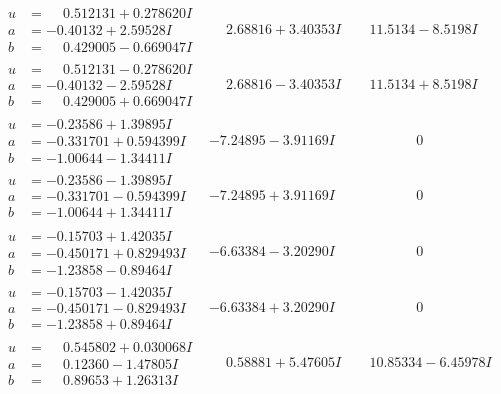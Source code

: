 \documentclass[1p]{elsarticle_modified}
\theoremstyle{definition}
\begin{document}
$$\begin{array}{c|c|c}
\begin{aligned}
u &= \phantom{-}0.512131 + 0.278620 I \\
a &= -0.40132 + 2.59528 I \\
b &= \phantom{-}0.429005 - 0.669047 I\end{aligned}
 & \phantom{-}2.68816 + 3.40353 I & \phantom{-}11.5134 - 8.5198 I \\ \hline\begin{aligned}
u &= \phantom{-}0.512131 - 0.278620 I \\
a &= -0.40132 - 2.59528 I \\
b &= \phantom{-}0.429005 + 0.669047 I\end{aligned}
 & \phantom{-}2.68816 - 3.40353 I & \phantom{-}11.5134 + 8.5198 I \\ \hline\begin{aligned}
u &= -0.23586 + 1.39895 I \\
a &= -0.331701 + 0.594399 I \\
b &= -1.00644 - 1.34411 I\end{aligned}
 & -7.24895 - 3.91169 I & \phantom{-0.000000 } 0 \\ \hline\begin{aligned}
u &= -0.23586 - 1.39895 I \\
a &= -0.331701 - 0.594399 I \\
b &= -1.00644 + 1.34411 I\end{aligned}
 & -7.24895 + 3.91169 I & \phantom{-0.000000 } 0 \\ \hline\begin{aligned}
u &= -0.15703 + 1.42035 I \\
a &= -0.450171 + 0.829493 I \\
b &= -1.23858 - 0.89464 I\end{aligned}
 & -6.63384 - 3.20290 I & \phantom{-0.000000 } 0 \\ \hline\begin{aligned}
u &= -0.15703 - 1.42035 I \\
a &= -0.450171 - 0.829493 I \\
b &= -1.23858 + 0.89464 I\end{aligned}
 & -6.63384 + 3.20290 I & \phantom{-0.000000 } 0 \\ \hline\begin{aligned}
u &= \phantom{-}0.545802 + 0.030068 I \\
a &= \phantom{-}0.12360 - 1.47805 I \\
b &= \phantom{-}0.89653 + 1.26313 I\end{aligned}
 & \phantom{-}0.58881 + 5.47605 I & \phantom{-}10.85334 - 6.45978 I\\

\end{array}$$
\end{document}
